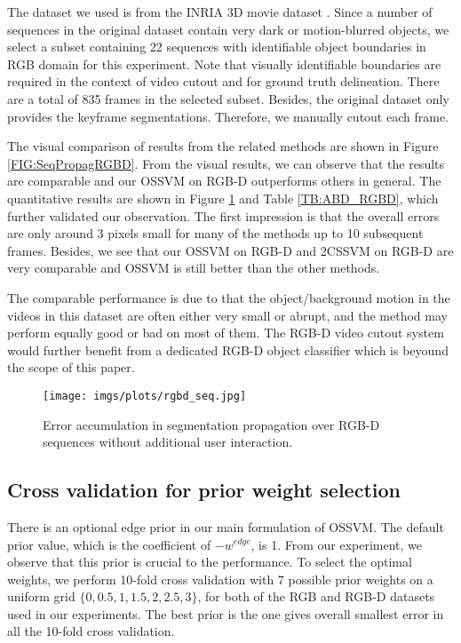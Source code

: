 \documentclass[10pt,journal,compsoc]{newIEEEtran}
\begin{document}
The dataset we used is from the INRIA 3D movie dataset \cite{Seguin153DMovie}. Since a number of sequences in the original dataset contain very dark or motion-blurred objects, we select a subset containing 22 sequences with identifiable object boundaries in RGB domain for this experiment. Note that visually identifiable boundaries are required in the context of video cutout and for ground truth delineation. There are a total of 835 frames in the selected subset. Besides, the original dataset only provides the keyframe segmentations. Therefore, we manually cutout each frame.

The visual comparison of results from the related methods are shown in Figure \ref{FIG:SeqPropagRGBD}. From the visual results, we can observe that the results are comparable and our OSSVM on RGB-D outperforms others in general. The quantitative results are shown in Figure \ref{FIG:Rst_SeqPropagRGBD} and Table \ref{TB:ABD_RGBD}, which further validated our observation. The first impression is that the overall errors are only around 3 pixels small for many of the methods up to 10 subsequent frames. Besides, we see that our OSSVM on RGB-D and 2CSSVM on RGB-D are very comparable and OSSVM is still better than the other methods.

The comparable performance is due to that the object/background motion in the videos in this dataset are often either very small or abrupt, and the method may perform equally good or bad on most of them. The RGB-D video cutout system would further benefit from a dedicated RGB-D object classifier which is beyound the scope of this paper.

\begin{figure}[!t]
\centering
\texttt{[image: imgs/plots/rgbd\_seq.jpg]}
\caption{Error accumulation in segmentation propagation over RGB-D sequences without additional user interaction. }\label{FIG:Rst_SeqPropagRGBD}\vspace{-0.5cm}
\end{figure}\subsection{Cross validation for prior weight selection}
There is an optional edge prior in our main formulation of OSSVM. The default prior value, which is the coefficient of $-w^{edge}$, is 1. From our experiment, we observe that this prior is crucial to the performance. To select the optimal weights, we perform 10-fold cross validation with 7 possible prior weights on a uniform grid $\{0,0.5,1,1.5,2,2.5,3\}$, for both of the RGB and RGB-D datasets used in our experiments. The best prior is the one gives overall smallest error in all the 10-fold cross validation.
\end{document}

